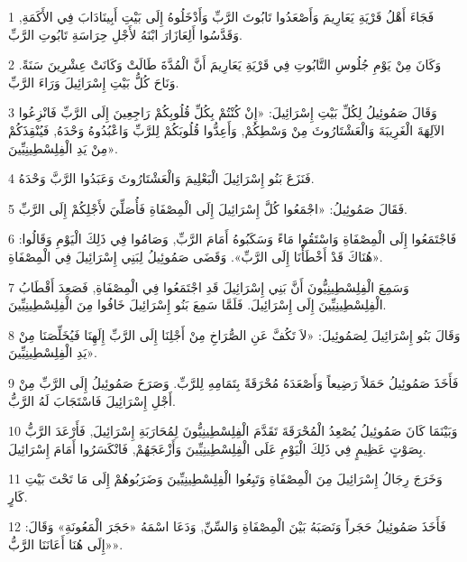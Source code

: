 \par 1 فَجَاءَ أَهْلُ قَرْيَةِ يَعَارِيمَ وَأَصْعَدُوا تَابُوتَ الرَّبِّ وَأَدْخَلُوهُ إِلَى بَيْتِ أَبِينَادَابَ فِي الأَكَمَةِ, وَقَدَّسُوا أَلِعَازَارَ ابْنَهُ لأَجْلِ حِرَاسَةِ تَابُوتِ الرَّبِّ.
\par 2 وَكَانَ مِنْ يَوْمِ جُلُوسِ التَّابُوتِ فِي قَرْيَةِ يَعَارِيمَ أَنَّ الْمُدَّةَ طَالَتْ وَكَانَتْ عِشْرِينَ سَنَةً. وَنَاحَ كُلُّ بَيْتِ إِسْرَائِيلَ وَرَاءَ الرَّبِّ.
\par 3 وَقَالَ صَمُوئِيلُ لِكُلِّ بَيْتِ إِسْرَائِيلَ: «إِنْ كُنْتُمْ بِكُلِّ قُلُوبِكُمْ رَاجِعِينَ إِلَى الرَّبِّ فَانْزِعُوا الآلِهَةَ الْغَرِيبَةَ وَالْعَشْتَارُوثَ مِنْ وَسْطِكُمْ, وَأَعِدُّوا قُلُوبَكُمْ لِلرَّبِّ وَاعْبُدُوهُ وَحْدَهُ, فَيُنْقِذَكُمْ مِنْ يَدِ الْفِلِسْطِينِيِّينَ».
\par 4 فَنَزَعَ بَنُو إِسْرَائِيلَ الْبَعْلِيمَ وَالْعَشْتَارُوثَ وَعَبَدُوا الرَّبَّ وَحْدَهُ.
\par 5 فَقَالَ صَمُوئِيلُ: «اجْمَعُوا كُلَّ إِسْرَائِيلَ إِلَى الْمِصْفَاةِ فَأُصَلِّيَ لأَجْلِكُمْ إِلَى الرَّبِّ.
\par 6 فَاجْتَمَعُوا إِلَى الْمِصْفَاةِ وَاسْتَقُوا مَاءً وَسَكَبُوهُ أَمَامَ الرَّبِّ, وَصَامُوا فِي ذَلِكَ الْيَوْمِ وَقَالُوا: «هُنَاكَ قَدْ أَخْطَأْنَا إِلَى الرَّبِّ». وَقَضَى صَمُوئِيلُ لِبَنِي إِسْرَائِيلَ فِي الْمِصْفَاةِ.
\par 7 وَسَمِعَ الْفِلِسْطِينِيُّونَ أَنَّ بَنِي إِسْرَائِيلَ قَدِ اجْتَمَعُوا فِي الْمِصْفَاةِ, فَصَعِدَ أَقْطَابُ الْفِلِسْطِينِيِّينَ إِلَى إِسْرَائِيلَ. فَلَمَّا سَمِعَ بَنُو إِسْرَائِيلَ خَافُوا مِنَ الْفِلِسْطِينِيِّينَ.
\par 8 وَقَالَ بَنُو إِسْرَائِيلَ لِصَمُوئِيلَ: «لاَ تَكُفَّ عَنِ الصُّرَاخِ مِنْ أَجْلِنَا إِلَى الرَّبِّ إِلَهِنَا فَيُخَلِّصَنَا مِنْ يَدِ الْفِلِسْطِينِيِّينَ».
\par 9 فَأَخَذَ صَمُوئِيلُ حَمَلاً رَضِيعاً وَأَصْعَدَهُ مُحْرَقَةً بِتَمَامِهِ لِلرَّبِّ. وَصَرَخَ صَمُوئِيلُ إِلَى الرَّبِّ مِنْ أَجْلِ إِسْرَائِيلَ فَاسْتَجَابَ لَهُ الرَّبُّ.
\par 10 وَبَيْنَمَا كَانَ صَمُوئِيلُ يُصْعِدُ الْمُحْرَقَةَ تَقَدَّمَ الْفِلِسْطِينِيُّونَ لِمُحَارَبَةِ إِسْرَائِيلَ, فَأَرْعَدَ الرَّبُّ بِصَوْتٍ عَظِيمٍ فِي ذَلِكَ الْيَوْمِ عَلَى الْفِلِسْطِينِيِّينَ وَأَزْعَجَهُمْ, فَانْكَسَرُوا أَمَامَ إِسْرَائِيلَ.
\par 11 وَخَرَجَ رِجَالُ إِسْرَائِيلَ مِنَ الْمِصْفَاةِ وَتَبِعُوا الْفِلِسْطِينِيِّينَ وَضَرَبُوهُمْ إِلَى مَا تَحْتَ بَيْتِ كَارٍ.
\par 12 فَأَخَذَ صَمُوئِيلُ حَجَراً وَنَصَبَهُ بَيْنَ الْمِصْفَاةِ وَالسِّنِّ, وَدَعَا اسْمَهُ «حَجَرَ الْمَعُونَةِ» وَقَالَ: «إِلَى هُنَا أَعَانَنَا الرَّبُّ».

